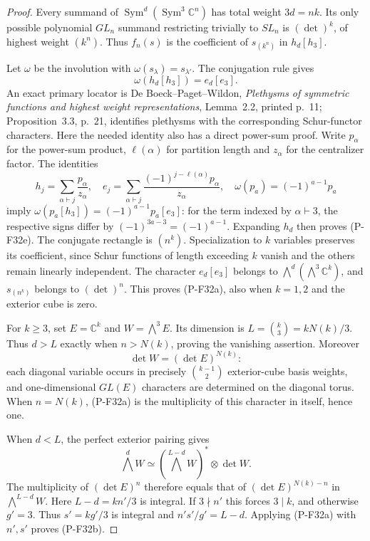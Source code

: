 \documentclass[11pt,a4paper]{article}
\begin{document}
\begin{proof}
Every summand of $\operatorname{Sym}^d(\operatorname{Sym}^3
\mathbb C^n)$ has total weight $3d=nk$. Its only possible
polynomial $GL_n$ summand restricting trivially to $SL_n$
is $(\det)^k$, of highest weight $(k^n)$. Thus $f_n(s)$
is the coefficient of $s_{(k^n)}$ in $h_d[h_3]$.

Let $\omega$ be the involution with
$\omega(s_\lambda)=s_{\lambda'}$. The conjugation rule gives
\[
                         \omega(h_d[h_3])=e_d[e_3].
 \tag{P-F32e}
\]
An exact primary locator is De Boeck--Paget--Wildon,
\emph{Plethysms of symmetric functions and highest weight
representations}, Lemma~2.2, printed p.~11; Proposition~3.3, p.~21,
identifies plethysms with the corresponding Schur-functor
characters. Here the needed identity also has a direct
power-sum proof. Write $p_\alpha$ for the power-sum product,
$\ell(\alpha)$ for partition length and $z_\alpha$ for the
centralizer factor. The identities
\[
 h_j=\sum_{\alpha\vdash j}\frac{p_\alpha}{z_\alpha},
 \quad
 e_j=\sum_{\alpha\vdash j}
          \frac{(-1)^{j-\ell(\alpha)}p_\alpha}{z_\alpha},
 \quad \omega(p_a)=(-1)^{a-1}p_a
\]
imply $\omega(p_a[h_3])=(-1)^{a-1}p_a[e_3]$:
for the term indexed by $\alpha\vdash3$, the respective
signs differ by $(-1)^{3a-3}=(-1)^{a-1}$.
Expanding $h_d$ then proves (P-F32e).
The conjugate rectangle is $(n^k)$. Specialization to
$k$ variables preserves its coefficient, since Schur
functions of length exceeding $k$ vanish and the others
remain linearly independent. The character $e_d[e_3]$
belongs to $\bigwedge^d(\bigwedge^3\mathbb C^k)$, and
$s_{(n^k)}$ belongs to $(\det)^n$. This proves (P-F32a),
also when $k=1,2$ and the exterior cube is zero.

For $k\ge3$, set $E=\mathbb C^k$ and $W=\bigwedge^3E$.
Its dimension is $L=\binom{k}{3}=kN(k)/3$. Thus $d>L$
exactly when $n>N(k)$, proving the vanishing assertion.
Moreover
\[
                       \det W=(\det E)^{N(k)}:
 \tag{P-F32f}
\]
each diagonal variable occurs in precisely $\binom{k-1}{2}$
exterior-cube basis weights, and one-dimensional $GL(E)$
characters are determined on the diagonal torus.
When $n=N(k)$, (P-F32a) is the multiplicity of this
character in itself, hence one.

When $d<L$, the perfect exterior pairing gives
\[
 \bigwedge^dW\simeq
        \left(\bigwedge^{L-d}W\right)^*\otimes\det W.
 \tag{P-F32g}
\]
The multiplicity of $(\det E)^n$ therefore equals that
of $(\det E)^{N(k)-n}$ in $\bigwedge^{L-d}W$.
Here $L-d=kn'/3$ is integral. If $3\nmid n'$ this
forces $3\mid k$, and otherwise $g'=3$. Thus
$s'=kg'/3$ is integral and $n's'/g'=L-d$.
Applying (P-F32a) with $n',s'$ proves (P-F32b).


\end{proof}
\end{document}
